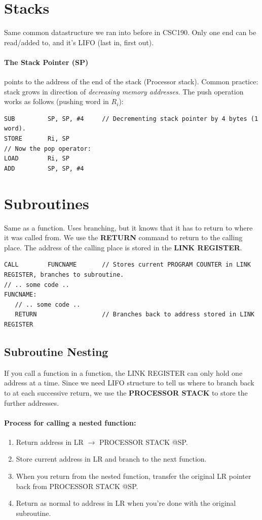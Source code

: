 \documentclass[a4paper,12pt]{report}
\begin{document}
\section{Stacks}
Same common datastructure we ran into before in CSC190. Only one end can be read/added to, and it's LIFO (last in, first out).

\paragraph{The Stack Pointer (SP)} points to the address of the end of the stack (Processor stack). Common practice: stack grows in direction of 
\textit{decreasing memory addresses}. 
The push operation works as follows (pushing word in $R_i$):
\begin{lstlisting}
SUB         SP, SP, #4     // Decrementing stack pointer by 4 bytes (1 word).
STORE       Ri, SP
// Now the pop operator:
LOAD        Ri, SP
ADD         SP, SP, #4
\end{lstlisting}

\section{Subroutines}
Same as a function. Uses branching, but it knows that it has to return to where it was called from. We use the \textbf{RETURN} command 
to return to the calling place. The address of the calling place is stored in the \textbf{LINK REGISTER}.

\begin{lstlisting}
CALL        FUNCNAME       // Stores current PROGRAM COUNTER in LINK REGISTER, branches to subroutine.
// .. some code ..
FUNCNAME: 
   // .. some code ..
   RETURN                  // Branches back to address stored in LINK REGISTER
\end{lstlisting}

\subsection{Subroutine Nesting}
If you call a function in a function, the LINK REGISTER can only hold one address at a time. Since we need LIFO structure to 
tell us where to branch back to at each successive return, we use the \textbf{PROCESSOR STACK} to store the further addresses.

\paragraph{Process for calling a nested function: }
\begin{enumerate}
\item Return address in LR $\to$ PROCESSOR STACK @SP.
\item Store current address in LR and branch to the next function.
\item When you return from the nested function, transfer the original LR pointer back from PROCESSOR STACK @SP.
\item Return as normal to address in LR when you're done with the original subroutine.
\end{enumerate}
\end{document}
